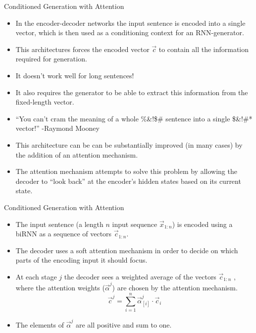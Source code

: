 \documentclass[handout]{beamer}
\begin{document}
\begin{frame}{Conditioned Generation with Attention}
\begin{scriptsize}
\begin{itemize}
\item In the encoder-decoder networks the input sentence is encoded into a single vector, which is then used as a conditioning context for an RNN-generator. 
\item This architectures forces the encoded vector $\vec{c}$ to contain all the information required for generation.
\item It doesn't work well for long sentences!
\item It also requires the generator to be able to extract this information from the fixed-length vector.
\item ``You can't cram the meaning of a whole \%\&!\$\# sentence into a single \$\&!\#* vector!'' -Raymond Mooney
\item This architecture can be can be substantially improved (in many cases) by the addition of an attention mechanism.
\item The attention mechanism attempts to solve this problem by allowing the decoder to “look back” at the encoder’s hidden states based on its current state. 
\end{itemize}
\end{scriptsize}
\end{frame}



\begin{frame}{Conditioned Generation with Attention}
\begin{scriptsize}
\begin{itemize}
\item The input sentence (a length $n$ input sequence $\vec{x}_{1:n}$) is encoded using a biRNN as a sequence of vectors $\vec{c}_{1:n}$.  
\item The decoder uses a soft attention mechanism in order to decide on which parts of the encoding input it should focus. 
\item At each stage $j$ the decoder sees a weighted average of the vectors $\vec{c}_{1:n}$ , where the attention weights ($\vec{\alpha}^j$) are chosen by the attention mechanism.
\begin{displaymath}
\vec{c}^j = \sum_{i=1}^{n} \vec{\alpha}_{[i]}^{j}\cdot \vec{c}_i 
\end{displaymath}
\item The elements of $\vec{\alpha}^j$ are all positive and sum to one.



\end{itemize}
\end{scriptsize}
\end{frame}
\end{document}

